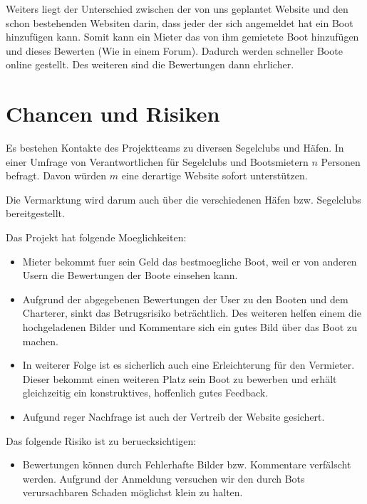 \documentclass[12pt]{article}
\theoremstyle{definition}
\begin{document}
Weiters liegt der Unterschied zwischen der von uns geplantet Website und den schon bestehenden Websiten darin, dass jeder der sich angemeldet hat ein Boot hinzufügen kann. Somit kann ein Mieter das von ihm gemietete Boot hinzufügen und dieses Bewerten (Wie in einem Forum). Dadurch werden schneller Boote online gestellt. Des weiteren sind die Bewertungen dann ehrlicher.

\pagebreak

\section{Chancen und Risiken}
Es bestehen Kontakte des Projektteams zu diversen Segelclubs und Häfen. In einer Umfrage von Verantwortlichen für Segelclubs und Bootsmietern $n$ Personen befragt. Davon würden $m$ eine derartige Website sofort unterstützen. 

Die Vermarktung wird  darum auch über die verschiedenen Häfen bzw. Segelclubs bereitgestellt.

Das Projekt hat folgende Moeglichkeiten:
\begin{itemize}
\item Mieter bekommt fuer sein Geld das bestmoegliche Boot, weil er von anderen Usern die Bewertungen der Boote einsehen kann.
\item Aufgrund der abgegebenen Bewertungen der User zu den Booten und dem Charterer, sinkt das Betrugsrisiko beträchtlich. Des weiteren helfen einem die hochgeladenen Bilder und Kommentare sich ein gutes Bild über das Boot zu machen.
\item In weiterer Folge ist es sicherlich auch eine Erleichterung für den Vermieter. Dieser bekommt einen weiteren Platz sein Boot zu bewerben und erhält gleichzeitig ein konstruktives, hoffenlich gutes Feedback.
\item Aufgund reger Nachfrage ist auch der Vertreib der Website gesichert.
\end{itemize}

Das folgende Risiko ist zu beruecksichtigen:
\begin{itemize}
\item Bewertungen können durch Fehlerhafte Bilder bzw. Kommentare verfälscht werden. Aufgrund der Anmeldung versuchen wir den durch Bots verursachbaren Schaden möglichst klein zu halten.
\end{itemize}

\pagebreak
\end{document}
